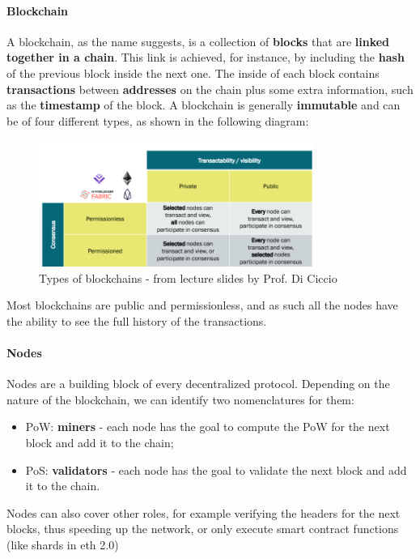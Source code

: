 \documentclass[12pt,a4paper,oneside]{article}
\theoremstyle{definition}
\begin{document}
\paragraph{Blockchain} A blockchain, as the name suggests, is a collection of \textbf{blocks} that are \textbf{linked together in a chain}. This link is achieved, for instance, by including the \textbf{hash} of the previous block inside the next one. The inside of each block contains \textbf{transactions} between \textbf{addresses} on the chain plus some extra information, such as the \textbf{timestamp} of the block. A blockchain is generally \textbf{immutable} and can be of four different types, as shown in the following diagram:
\begin{figure}[H]
	\centering
	\includegraphics[width=0.8\textwidth]{figures/bt_types.png}
	\caption{Types of blockchains - from lecture slides by Prof. Di Ciccio}
	\label{fig:blockchain_types}
\end{figure}
Most blockchains are public and permissionless, and as such all the nodes have the ability to see the full history of the transactions.


\paragraph{Nodes} Nodes are a building block of every decentralized protocol. Depending on the nature of the blockchain, we can identify two nomenclatures for them:
\begin{itemize}
	\item PoW: \textbf{miners} - each node has the goal to compute the PoW for the next block and add it to the chain;
	\item PoS: \textbf{validators} - each node has the goal to validate the next block and add it to the chain.
\end{itemize}
Nodes can also cover other roles, for example verifying the headers for the next blocks, thus speeding up the network, or only execute smart contract functions (like shards in eth 2.0) \\
\end{document}

